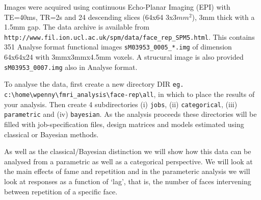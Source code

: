 Images were acquired using continuous Echo-Planar 
Imaging (EPI) with TE=40ms, TR=2s and 24 descending slices (64x64 3x3$mm^2$), 3mm thick with a 1.5mm gap.
The data archive is available from
 \verb!http://www.fil.ion.ucl.ac.uk/spm/data/face_rep_SPM5.html!.
This contains 351 Analyse format functional images
\verb!sM03953_0005_*.img! of dimension 
64x64x24 with 3mmx3mmx4.5mm voxels. A strucural 
image is also provided \verb!sM03953_0007.img! also in Analyse format.

To analyse the data, first create a new directory DIR 
\newline \verb!eg. c:\home\wpenny\fmri_analysis\face-rep\all!, in which to place the results
of your analysis. Then create 4 subdirectories (i) \verb!jobs!, 
(ii)  \verb!categorical!, (iii)  \verb!parametric! and (iv) \verb!bayesian!. As the analysis 
proceeds these directories will be filled with job-specification files, design matrices 
and models estimated using classical or Bayesian 
methods. 

As well as the classical/Bayesian 
distinction we will show how this 
data can be analysed from a parametric as well as a categorical perspective. We will look at the 
main effects of fame and repetition and in the 
parameteric analysis we will look at 
responses as a function of `lag', that is, the number of faces intervening between repetition of a specific face.

